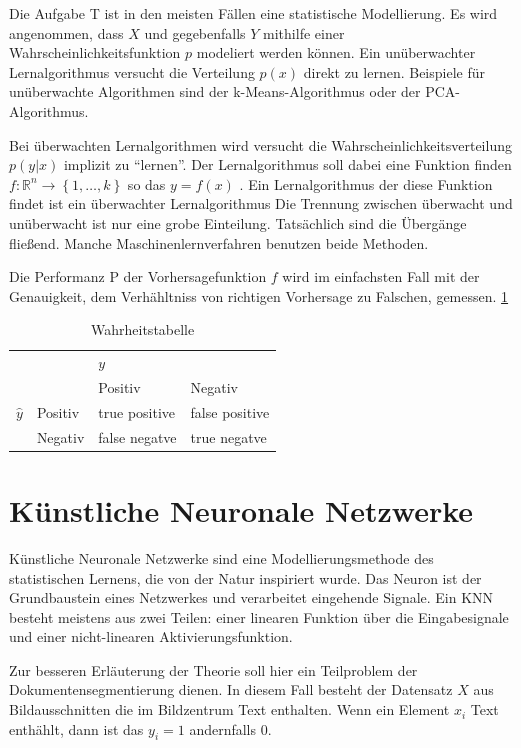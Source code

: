 Die Aufgabe T ist in den meisten Fällen eine statistische Modellierung.
Es wird angenommen, dass \(X\) und gegebenfalls \(Y\) mithilfe einer Wahrscheinlichkeitsfunktion \(p\)
modeliert werden können. 
Ein unüberwachter Lernalgorithmus versucht die Verteilung \(p(x)\) direkt zu lernen.
Beispiele für unüberwachte Algorithmen sind der k-Means-Algorithmus oder der PCA-Algorithmus.

Bei überwachten Lernalgorithmen wird versucht die Wahrscheinlichkeitsverteilung \(p(y | x)\) implizit zu ``lernen''.
Der Lernalgorithmus soll dabei eine Funktion finden \(f: \mathds{R}^n \rightarrow \left\{1,\dots,k \right\} \) so das \(y = f\left(x\right)\) \parencite[97 ff]{GoodfellowDeeplearning2016}.
Ein Lernalgorithmus der diese Funktion findet ist ein überwachter Lernalgorithmus 
Die Trennung zwischen überwacht und unüberwacht ist nur eine grobe Einteilung. 
Tatsächlich sind die Übergänge fließend. 
Manche Maschinenlernverfahren benutzen beide Methoden.  

Die Performanz P der Vorhersagefunktion \(f\) wird im einfachsten Fall mit der Genauigkeit,
dem Verhähltniss von richtigen Vorhersage zu Falschen, gemessen. 
\cref{tab:truth}
\begin{table}
    \caption{Wahrheitstabelle}
    \label{tab:truth}
    \begin{tabular}{llll}
                    &&\(y\)& \\
                            && Positiv       & Negativ \\
    \(\hat{y}\) & Positiv  & true positive  & false positive \\
                & Negativ & false negatve   & true negatve \\
    \end{tabular}       
\end{table}    
\section{Künstliche Neuronale Netzwerke}

Künstliche Neuronale Netzwerke  sind eine Modellierungsmethode des statistischen Lernens, die von der Natur inspiriert wurde. 
Das Neuron ist der Grundbaustein eines Netzwerkes und verarbeitet eingehende Signale. 
Ein KNN besteht meistens aus zwei Teilen: einer linearen Funktion über die Eingabesignale und 
einer nicht-linearen Aktivierungsfunktion.

Zur besseren Erläuterung der Theorie soll hier ein Teilproblem der Dokumentensegmentierung dienen.
In diesem Fall besteht der Datensatz \(X\) aus Bildausschnitten die im Bildzentrum Text enthalten.
Wenn ein Element \(x_i\) Text enthählt, dann ist das \(y_i = 1\) andernfalls \(0\).

